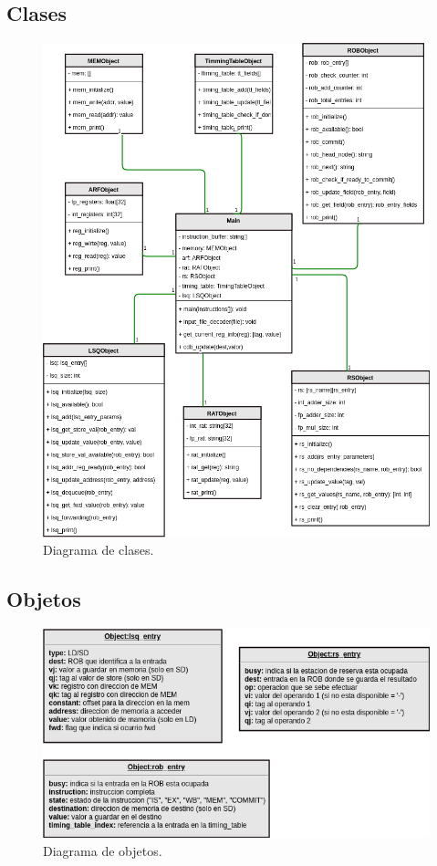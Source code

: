 \documentclass[a4paper]{article}
\begin{document}
	\subsection*{Clases}
	
	\begin{figure}[H]
		\centering
		\includegraphics[width=1\textwidth]{figures/clases.png}
		\caption{\label{fig:clases}Diagrama de clases.}
	\end{figure}

	\subsection*{Objetos}

	\begin{figure}[H]		
		\centering
		\includegraphics[width=.7\textwidth]{figures/objetos.png}
		\caption{\label{fig:objetos}Diagrama de objetos.}
	\end{figure}
\end{document}
